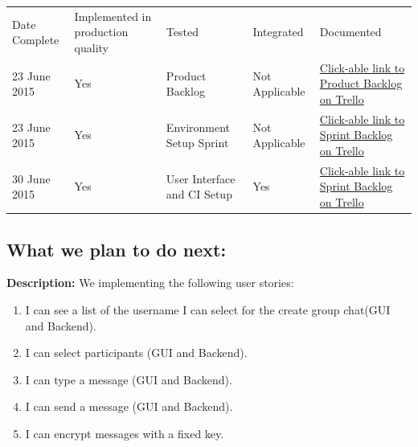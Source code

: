 \documentclass[a4paper]{article}
\begin{document}
\setlength{\arrayrulewidth}{0.5mm}
\setlength{\tabcolsep}{12pt}
\renewcommand{\arraystretch}{2} 
\begin{tabular}{ |p{2.5cm}|p{2.5cm}|p{2.5cm}|p{2.5cm}| p{2.5cm}| }
\hline
\rowcolor{lightgray} \multicolumn{5}{|c|}{Completed Work} \\
\hline
Date Complete & Implemented in production quality & Tested & Integrated & Documented \\
\hline
23 June 2015 & Yes & Product Backlog & Not Applicable & \href{https://trello.com/b/FtBs3HX1}{Click-able link to Product Backlog on Trello}\\ \hline
23 June 2015 & Yes & Environment Setup Sprint & Not Applicable & \href{https://trello.com/b/hBJF6EUd}{Click-able link to Sprint Backlog on Trello}\\ 
\hline
30 June 2015 & Yes & User Interface and CI Setup & Yes & \href{https://trello.com/b/hBJF6EUd}{Click-able link to Sprint Backlog on Trello}\\ 
\hline

\end{tabular}

\subsection{What we plan to do next:}
\textbf{Description: }We implementing the following user stories:
\begin{enumerate} 
\item I can see a list of the username I can select for the create group chat(GUI and Backend).
\item I can select participants (GUI and Backend).
\item I can type a message (GUI and Backend).
\item I can send a message (GUI and Backend).
\item I can encrypt messages with a fixed key.
\end{enumerate}
\end{document}
